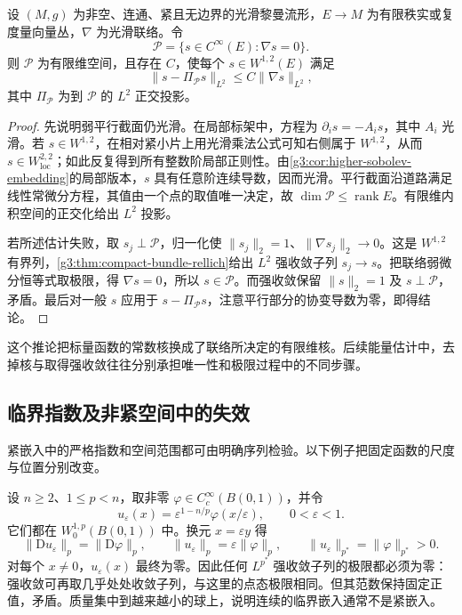 \begin{corollary}\label{g3:cor:bundle-poincare-kernel}
	设 \((M,g)\) 为非空、连通、紧且无边界的光滑黎曼流形，\(E\to M\) 为有限秩实或复度量向量丛，\(\nabla\) 为光滑联络。令
	\[
		\mathcal P=\{s\in C^\infty(E):\nabla s=0\}.
	\]
	则 \(\mathcal P\) 为有限维空间，且存在 \(C\)，使每个 \(s\in W^{1,2}(E)\) 满足
	\[
		\|s-\Pi_{\mathcal P}s\|_{L^2}\le C\|\nabla s\|_{L^2},
	\]
	其中 \(\Pi_{\mathcal P}\) 为到 \(\mathcal P\) 的 \(L^2\) 正交投影。
\end{corollary}
\begin{proof}
	先说明弱平行截面仍光滑。在局部标架中，方程为 \(\partial_i s=-A_i s\)，其中 \(A_i\) 光滑。若 \(s\in W^{1,2}\)，在相对紧小片上用光滑乘法公式可知右侧属于 \(W^{1,2}\)，从而 \(s\in W^{2,2}_{\mathrm{loc}}\)；如此反复得到所有整数阶局部正则性。由\cref{g3:cor:higher-sobolev-embedding}的局部版本，\(s\) 具有任意阶连续导数，因而光滑。平行截面沿道路满足线性常微分方程，其值由一个点的取值唯一决定，故 \(\dim\mathcal P\le\operatorname{rank}E\)。有限维内积空间的正交化给出 \(L^2\) 投影。

	若所述估计失败，取 \(s_j\perp\mathcal P\)，归一化使 \(\|s_j\|_2=1\)、\(\|\nabla s_j\|_2\to0\)。这是 \(W^{1,2}\) 有界列，\cref{g3:thm:compact-bundle-rellich}给出 \(L^2\) 强收敛子列 \(s_j\to s\)。把联络弱微分恒等式取极限，得 \(\nabla s=0\)，所以 \(s\in\mathcal P\)。而强收敛保留 \(\|s\|_2=1\) 及 \(s\perp\mathcal P\)，矛盾。最后对一般 \(s\) 应用于 \(s-\Pi_{\mathcal P}s\)，注意平行部分的协变导数为零，即得结论。
\end{proof}

这个推论把标量函数的常数核换成了联络所决定的有限维核。后续能量估计中，去掉核与取得强收敛往往分别承担唯一性和极限过程中的不同步骤。

\subsection{临界指数及非紧空间中的失效}
\label{g3:subsec:1105:04}
紧嵌入中的严格指数和空间范围都可由明确序列检验。以下例子把固定函数的尺度与位置分别改变。

\begin{example}\label{g3:exm:critical-sobolev-concentration}
	设 \(n\ge2\)、\(1\le p<n\)，取非零 \(\varphi\in C_c^\infty(B(0,1))\)，并令
	\[
		u_\varepsilon(x)=\varepsilon^{1-n/p}\varphi(x/\varepsilon),\qquad0<\varepsilon<1.
	\]
	它们都在 \(W^{1,p}_0(B(0,1))\) 中。换元 \(x=\varepsilon y\) 得
	\[
		\|\mathrm D u_\varepsilon\|_p=\|\mathrm D\varphi\|_p,\qquad
		\|u_\varepsilon\|_p=\varepsilon\|\varphi\|_p,\qquad
		\|u_\varepsilon\|_{p^*}=\|\varphi\|_{p^*}>0.
	\]
	对每个 \(x\ne0\)，\(u_\varepsilon(x)\) 最终为零。因此任何 \(L^{p^*}\) 强收敛子列的极限都必须为零：强收敛可再取几乎处处收敛子列，与这里的点态极限相同。但其范数保持固定正值，矛盾。质量集中到越来越小的球上，说明连续的临界嵌入通常不是紧嵌入。
\end{example}

